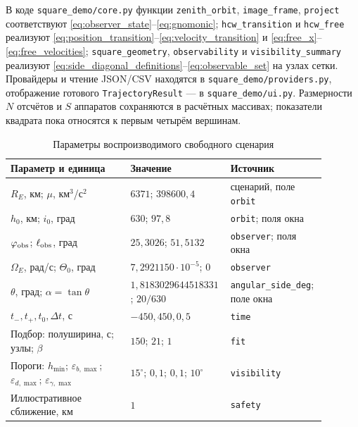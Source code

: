 \documentclass[a4paper,12pt]{article}
\begin{document}
В коде \texttt{square\_demo/core.py} функции
\texttt{zenith\_orbit}, \texttt{image\_frame}, \texttt{project}
соответствуют \eqref{eq:observer_state}--\eqref{eq:gnomonic};
\texttt{hcw\_transition} и \texttt{hcw\_free} реализуют
\eqref{eq:position_transition}--\eqref{eq:velocity_transition}
и \eqref{eq:free_x}--\eqref{eq:free_velocities};
\texttt{square\_geometry}, \texttt{observability} и
\texttt{visibility\_summary} реализуют
\eqref{eq:side_diagonal_definitions}--\eqref{eq:observable_set}
на узлах сетки. Провайдеры и чтение JSON/CSV находятся в
\texttt{square\_demo/providers.py}, отображение готового
\texttt{TrajectoryResult} --- в \texttt{square\_demo/ui.py}.
Размерности $N$ отсчётов и $S$ аппаратов сохраняются в расчётных
массивах; показатели квадрата пока относятся к первым четырём
вершинам.

\begin{table}[htbp]
\centering\small
\caption{Параметры воспроизводимого свободного сценария}
\label{tab:implementation_parameters}
\begin{tabular}{p{0.37\linewidth}p{0.24\linewidth}p{0.28\linewidth}}
\toprule
Параметр и единица & Значение & Источник \\
\midrule
$R_E$, км; $\mu$, км$^3$/с$^2$ & $6371$; $398600{,}4$ &
сценарий, поле \texttt{orbit}\\
$h_0$, км; $i_0$, град & $630$; $97{,}8$ &
\texttt{orbit}; поля окна\\
$\varphi_{\rm obs}$; $\ell_{\rm obs}$, град &
$25{,}3026$; $51{,}5132$ & \texttt{observer}; поля окна\\
$\Omega_E$, рад/с; $\Theta_0$, град &
$7{,}2921150\cdot10^{-5}$; $0$ & \texttt{observer}\\
$\theta$, град; $\alpha=\tan\theta$ &
$1{,}8183029644518331$; $20/630$ & \texttt{angular\_side\_deg}; поле окна\\
$t_-,t_+,t_0,\Delta t$, с &
$-450,450,0,5$ & \texttt{time}\\
Подбор: полуширина, с; узлы; $\beta$ &
$150$; $21$; $1$ & \texttt{fit}\\
Пороги: $h_{\min}$; $\varepsilon_{b,\max}$;
$\varepsilon_{d,\max}$; $\varepsilon_{\gamma,\max}$ &
$15^\circ$; $0{,}1$; $0{,}1$; $10^\circ$ & \texttt{visibility}\\
Иллюстративное сближение, км & $1$ & \texttt{safety}\\
\bottomrule
\end{tabular}
\end{table}
\end{document}
